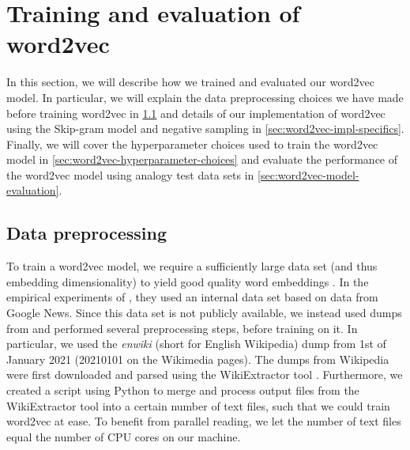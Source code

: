 \section{Training and evaluation of word2vec}
\label{sec:training-and-eval-our-word2vec-impl}
In this section, we will describe how we trained and evaluated our word2vec model. In particular, we will explain the data preprocessing choices we have made before training word2vec in \cref{sec:word2vec-data-preprocessing} and details of our implementation of word2vec using the Skip-gram model and negative sampling in \cref{sec:word2vec-impl-specifics}. Finally, we will cover the hyperparameter choices used to train the word2vec model in \cref{sec:word2vec-hyperparameter-choices} and evaluate the performance of the word2vec model using analogy test data sets in \cref{sec:word2vec-model-evaluation}.

\subsection{Data preprocessing}
\label{sec:word2vec-data-preprocessing}
To train a word2vec model, we require a sufficiently large data set (and thus embedding dimensionality) to yield good quality word embeddings \cite{mikolov2013b}. In the empirical experiments of \cite{mikolov2013b}, they used an internal data set based on data from Google News. Since this data set is not publicly available, we instead used dumps from \cite{WikimediaDumps} and performed several preprocessing steps, before training on it. In particular, we used the \textit{enwiki} (short for English Wikipedia) dump from 1st of January 2021 (20210101 on the Wikimedia pages). The dumps from Wikipedia were first downloaded and parsed using the WikiExtractor tool \cite{Wikiextractor2015}. Furthermore, we created a script using Python to merge and process output files from the WikiExtractor tool into a certain number of text files, such that we could train word2vec at ease. To benefit from parallel reading, we let the number of text files equal the number of CPU cores on our machine.


